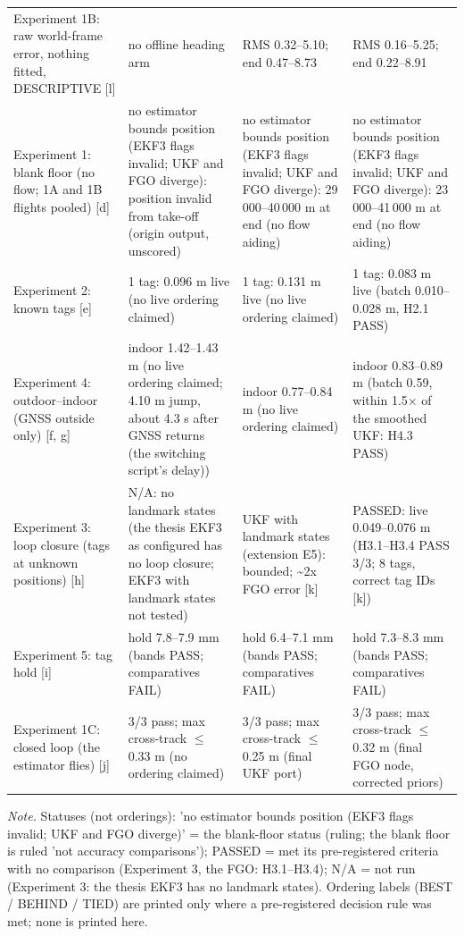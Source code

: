 \begin{table}[htbp]
\begin{tabular}{p{}p{}p{}p{}}
Experiment 1B: raw world-frame error, nothing fitted, DESCRIPTIVE [l] & no offline heading arm & RMS 0.32--5.10; end 0.47--8.73 & RMS 0.16--5.25; end 0.22--8.91 \\
Experiment 1: blank floor (no flow; 1A and 1B flights pooled) [d] & no estimator bounds position (EKF3 flags invalid; UKF and FGO diverge): position invalid from take-off (origin output, unscored) & no estimator bounds position (EKF3 flags invalid; UKF and FGO diverge): 29\,000--40\,000 m at end \textdagger{} (no flow aiding) & no estimator bounds position (EKF3 flags invalid; UKF and FGO diverge): 23\,000--41\,000 m at end \textdagger{} (no flow aiding) \\
Experiment 2: known tags [e] & 1 tag: 0.096 m live (no live ordering claimed) & 1 tag: 0.131 m live (no live ordering claimed) & 1 tag: 0.083 m live (batch 0.010--0.028 m, H2.1 PASS) \\
Experiment 4: outdoor--indoor (GNSS outside only) [f, g] & indoor 1.42--1.43 m (no live ordering claimed; 4.10 m jump, about 4.3 s after GNSS returns (the switching script's delay)) & indoor 0.77--0.84 m (no live ordering claimed) & indoor 0.83--0.89 m (batch 0.59, within 1.5$\times$ of the smoothed UKF: H4.3 PASS) \\
Experiment 3: loop closure (tags at unknown positions) [h] & N/A: no landmark states (the thesis EKF3 as configured has no loop closure; EKF3 with landmark states not tested) & UKF with landmark states (extension E5): bounded; \textasciitilde{}2x FGO error [k] & PASSED: live 0.049--0.076 m (H3.1--H3.4 PASS 3/3; 8 tags, correct tag IDs [k]) \\
Experiment 5: tag hold [i] & hold 7.8--7.9 mm (bands PASS; comparatives FAIL) & hold 6.4--7.1 mm (bands PASS; comparatives FAIL) & hold 7.3--8.3 mm (bands PASS; comparatives FAIL) \\
Experiment 1C: closed loop (the estimator flies) [j] & 3/3 pass; max cross-track $\le$ 0.33 m (no ordering claimed) & 3/3 pass; max cross-track $\le$ 0.25 m (final UKF port) & 3/3 pass; max cross-track $\le$ 0.32 m (final FGO node, corrected priors) \\
\bottomrule
\end{tabular}
\par\smallskip\raggedright
\textit{Note.} Statuses (not orderings): 'no estimator bounds position (EKF3 flags invalid; UKF and FGO diverge)' = the blank-floor status (ruling; the blank floor is ruled 'not accuracy comparisons'); PASSED = met its pre-registered criteria with no comparison (Experiment 3, the FGO: H3.1--H3.4); N/A = not run (Experiment 3: the thesis EKF3 has no landmark states). Ordering labels (BEST / BEHIND / TIED) are printed only where a pre-registered decision rule was met; none is printed here.\par

\end{table}
